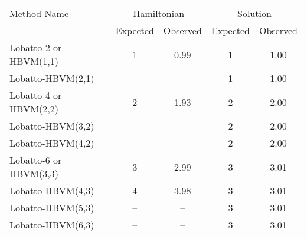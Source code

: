 \begin{tabular}{l|cccc}
\toprule
            Method Name & \multicolumn{2}{c}{Hamiltonian} & \multicolumn{2}{c}{Solution} \\
                        &    Expected & Observed & Expected & Observed \\
\midrule
 Lobatto-2 or HBVM(1,1) &         1 &     0.99 &      1 &     1.00 \\
      Lobatto-HBVM(2,1) &          -- &       -- &      1 &     1.00 \\
 Lobatto-4 or HBVM(2,2) &         2 &     1.93 &      2 &     2.00 \\
      Lobatto-HBVM(3,2) &          -- &       -- &      2 &     2.00 \\
      Lobatto-HBVM(4,2) &          -- &       -- &      2 &     2.00 \\
 Lobatto-6 or HBVM(3,3) &         3 &     2.99 &      3 &     3.01 \\
      Lobatto-HBVM(4,3) &         4 &     3.98 &      3 &     3.01 \\
      Lobatto-HBVM(5,3) &          -- &       -- &      3 &     3.01 \\
      Lobatto-HBVM(6,3) &          -- &       -- &      3 &     3.01 \\
\bottomrule
\end{tabular}
